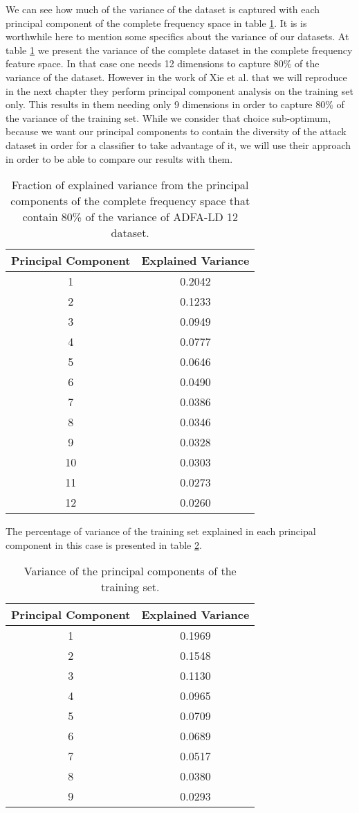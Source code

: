 \documentclass[reqno,openany,12pt]{amsbook}
\begin{document}
We can see how much of the variance of the dataset is captured with each principal component of the complete frequency space in table \ref{pcat1}. It is is worthwhile here to mention some specifics about the variance of our datasets. At table \ref{pcat1} we present the variance of the complete dataset in the complete frequency feature space. In that case one needs 12 dimensions to capture 80\% of the variance of the dataset. However in the work of Xie et al.\cite{adf1} that we will reproduce in the next chapter they perform principal component analysis on the training set only. This results in them needing only 9 dimensions in order to capture 80\% of the variance of the training set. While we consider that choice sub-optimum, because we want our principal components to contain the diversity of the attack dataset in order for a classifier to take advantage of it, we will use their approach in order to be able to compare our results with them.
\begin{table}
\begin{tabular}{|c|c|}
\hline
Principal Component &  Explained Variance \\ \hline 
1  & 0.2042 \\ \hline
2  & 0.1233 \\ \hline
3  & 0.0949 \\ \hline
4  & 0.0777 \\ \hline
5  & 0.0646 \\ \hline
6  & 0.0490 \\ \hline
7  & 0.0386 \\ \hline
8  & 0.0346 \\ \hline
9  & 0.0328 \\ \hline
10 & 0.0303 \\ \hline
11 & 0.0273 \\ \hline
12 & 0.0260 \\ \hline
\end{tabular}
\vspace{5pt}
\caption{Fraction of explained variance from the principal components of the complete frequency space that contain 80\% of the variance of ADFA-LD 12 dataset.}
\label{pcat1}
\end{table}
The percentage of variance of the training set explained in each principal component in this case is presented in table \ref{knnt1}.
\begin{table}
\begin{tabular}{|c|c|}
\hline
Principal Component &  Explained Variance \\ \hline 
1 & 0.1969 \\ \hline
2 & 0.1548 \\ \hline
3 & 0.1130 \\ \hline
4 & 0.0965 \\ \hline
5 & 0.0709 \\ \hline
6 & 0.0689 \\ \hline
7 & 0.0517 \\ \hline
8 & 0.0380 \\ \hline
9 & 0.0293 \\ \hline
\end{tabular}
\vspace{5pt}
\caption{Variance of the principal components of the training set.}
\label{knnt1}
\end{table}
\end{document}
